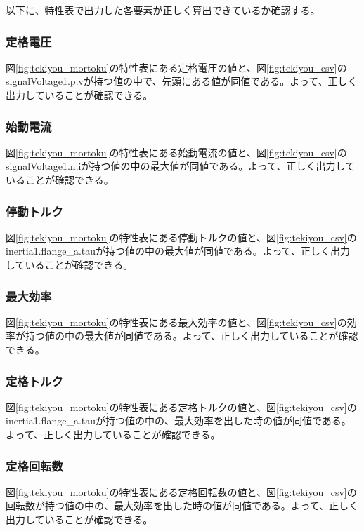 以下に、特性表で出力した各要素が正しく算出できているか確認する。%

\subsubsection{定格電圧}
図\ref{fig:tekiyou_mortoku}の特性表にある定格電圧の値と、図\ref{fig:tekiyou_csv}のsignalVoltage1.p.vが持つ値の中で、先頭にある値が同値である。よって、正しく出力していることが確認できる。
\subsubsection{始動電流}
図\ref{fig:tekiyou_mortoku}の特性表にある始動電流の値と、図\ref{fig:tekiyou_csv}のsignalVoltage1.n.iが持つ値の中の最大値が同値である。よって、正しく出力していることが確認できる。
\subsubsection{停動トルク}
図\ref{fig:tekiyou_mortoku}の特性表にある停動トルクの値と、図\ref{fig:tekiyou_csv}のinertia1.flange\_a.tauが持つ値の中の最大値が同値である。よって、正しく出力していることが確認できる。
\subsubsection{最大効率}
図\ref{fig:tekiyou_mortoku}の特性表にある最大効率の値と、図\ref{fig:tekiyou_csv}の効率が持つ値の中の最大値が同値である。よって、正しく出力していることが確認できる。
\subsubsection{定格トルク}
図\ref{fig:tekiyou_mortoku}の特性表にある定格トルクの値と、図\ref{fig:tekiyou_csv}のinertia1.flange\_a.tauが持つ値の中の、最大効率を出した時の値が同値である。よって、正しく出力していることが確認できる。
\subsubsection{定格回転数}
図\ref{fig:tekiyou_mortoku}の特性表にある定格回転数の値と、図\ref{fig:tekiyou_csv}の回転数が持つ値の中の、最大効率を出した時の値が同値である。よって、正しく出力していることが確認できる。

